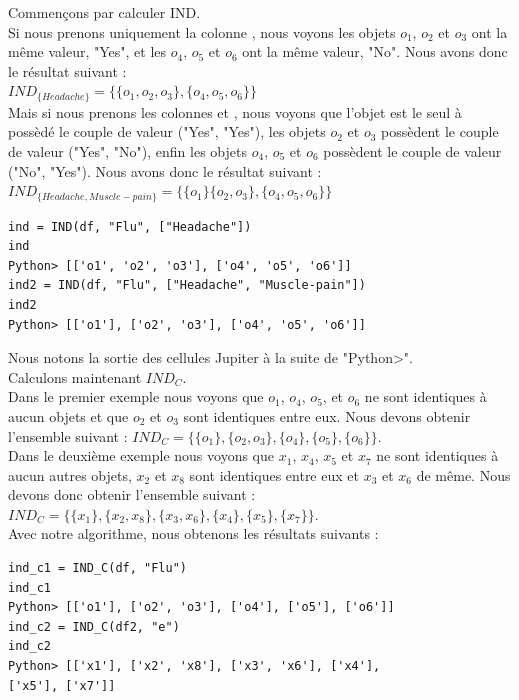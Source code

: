 \subsubsection{\ind}
Commençons par calculer IND. \\
Si nous prenons uniquement la colonne \headache, nous voyons
les objets $o_1$, $o_2$ et $o_3$ ont la même valeur, "Yes", et les
$o_4$, $o_5$ et $o_6$ ont la même valeur, "No". Nous avons donc le
résultat suivant : \\
$IND_{\{Headache\}} = \{\{o_1, o_2, o_3\}, \{o_4, o_5, o_6\}\}$ \\
Mais si nous prenons les colonnes \headache et
\musclepain, nous voyons que l'objet est le seul à possèdé le
couple de valeur ("Yes", "Yes"), les objets $o_2$ et $o_3$ possèdent
le couple de valeur ("Yes", "No"), enfin les objets $o_4$, $o_5$ et
$o_6$ possèdent le couple de valeur ("No", "Yes"). Nous avons donc le
résultat suivant : \\
$IND_{\{Headache, Muscle-pain\}} = \{\{o_1\} \{o_2, o_3\}, \{o_4, o_5,
	o_6\}\}$ \\
\begin{lstlisting}
ind = IND(df, "Flu", ["Headache"])
ind
Python> [['o1', 'o2', 'o3'], ['o4', 'o5', 'o6']]
ind2 = IND(df, "Flu", ["Headache", "Muscle-pain"])
ind2
Python> [['o1'], ['o2', 'o3'], ['o4', 'o5', 'o6']]
\end{lstlisting}
Nous notons la sortie des cellules Jupiter à la suite de "Python>". \\
Calculons maintenant $IND_C$. \\
Dans le premier exemple nous voyons que $o_1$, $o_4$, $o_5$, et
$o_6$ ne sont identiques à aucun objets et que $o_2$ et $o_3$
sont identiques entre eux. Nous devons obtenir l'ensemble suivant :
$IND_C = \{\{o_1\}, \{o_2, o_3\}, \{o_4\}, \{o_5\}, \{o_6\}\}$. \\
Dans le deuxième exemple nous voyons que $x_1$, $x_4$, $x_5$ et $x_7$
ne sont identiques à aucun autres objets, $x_2$ et $x_8$ sont
identiques entre eux et $x_3$ et $x_6$ de même. Nous devons donc
obtenir l'ensemble suivant : \\
$IND_C = \{\{x_1\}, \{x_2, x_8\}, \{x_3, x_6\}, \{x_4\}, \{x_5\},
	\{x_7\}\}$. \\
Avec notre algorithme, nous obtenons les résultats suivants :
\begin{lstlisting}
ind_c1 = IND_C(df, "Flu")
ind_c1
Python> [['o1'], ['o2', 'o3'], ['o4'], ['o5'], ['o6']]
ind_c2 = IND_C(df2, "e")
ind_c2
Python> [['x1'], ['x2', 'x8'], ['x3', 'x6'], ['x4'], 
['x5'], ['x7']]
\end{lstlisting}
